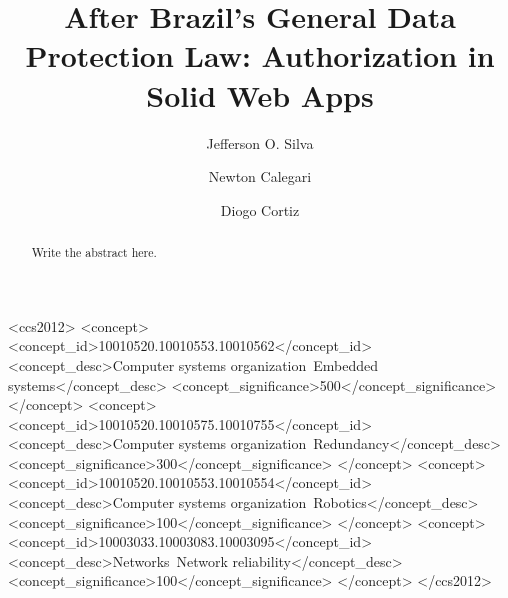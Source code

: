 \documentclass[sigconf]{acmart}
\begin{document}
%
\title{After Brazil's General Data Protection Law: Authorization in Solid Web Apps}

%
\author{Jefferson O. Silva}

\author{Newton Calegari}

\author{Diogo Cortiz}

%
\renewcommand{\shortauthors}{Silva et al.}

%
\begin{abstract}
Write the abstract here.

\end{abstract}

%
%
\begin{CCSXML}
<ccs2012>
 <concept>
  <concept_id>10010520.10010553.10010562</concept_id>
  <concept_desc>Computer systems organization~Embedded systems</concept_desc>
  <concept_significance>500</concept_significance>
 </concept>
 <concept>
  <concept_id>10010520.10010575.10010755</concept_id>
  <concept_desc>Computer systems organization~Redundancy</concept_desc>
  <concept_significance>300</concept_significance>
 </concept>
 <concept>
  <concept_id>10010520.10010553.10010554</concept_id>
  <concept_desc>Computer systems organization~Robotics</concept_desc>
  <concept_significance>100</concept_significance>
 </concept>
 <concept>
  <concept_id>10003033.10003083.10003095</concept_id>
  <concept_desc>Networks~Network reliability</concept_desc>
  <concept_significance>100</concept_significance>
 </concept>
</ccs2012>
\end{CCSXML}
\end{document}
